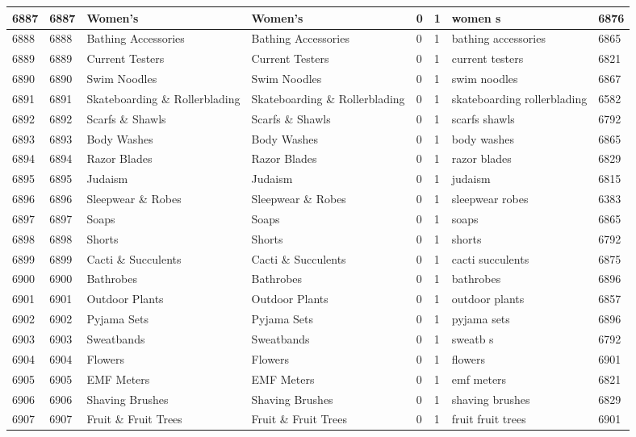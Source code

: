 \begin{longtable}{|l|l|l|l|l|l|l|l|}
6887 & 6887 & Women's & Women's & 0 & 1 & women s & 6876 \\ \hline 
6888 & 6888 & Bathing Accessories & Bathing Accessories & 0 & 1 & bathing accessories & 6865 \\ \hline 
6889 & 6889 & Current Testers & Current Testers & 0 & 1 & current testers & 6821 \\ \hline 
6890 & 6890 & Swim Noodles & Swim Noodles & 0 & 1 & swim noodles & 6867 \\ \hline 
6891 & 6891 & Skateboarding \& Rollerblading & Skateboarding \& Rollerblading & 0 & 1 & skateboarding rollerblading & 6582 \\ \hline 
6892 & 6892 & Scarfs \& Shawls & Scarfs \& Shawls & 0 & 1 & scarfs shawls & 6792 \\ \hline 
6893 & 6893 & Body Washes & Body Washes & 0 & 1 & body washes & 6865 \\ \hline 
6894 & 6894 & Razor Blades & Razor Blades & 0 & 1 & razor blades & 6829 \\ \hline 
6895 & 6895 & Judaism & Judaism & 0 & 1 & judaism & 6815 \\ \hline 
6896 & 6896 & Sleepwear \& Robes & Sleepwear \& Robes & 0 & 1 & sleepwear robes & 6383 \\ \hline 
6897 & 6897 & Soaps & Soaps & 0 & 1 & soaps & 6865 \\ \hline 
6898 & 6898 & Shorts & Shorts & 0 & 1 & shorts & 6792 \\ \hline 
6899 & 6899 & Cacti \& Succulents & Cacti \& Succulents & 0 & 1 & cacti succulents & 6875 \\ \hline 
6900 & 6900 & Bathrobes & Bathrobes & 0 & 1 & bathrobes & 6896 \\ \hline 
6901 & 6901 & Outdoor Plants & Outdoor Plants & 0 & 1 & outdoor plants & 6857 \\ \hline 
6902 & 6902 & Pyjama Sets & Pyjama Sets & 0 & 1 & pyjama sets & 6896 \\ \hline 
6903 & 6903 & Sweatbands & Sweatbands & 0 & 1 & sweatb s & 6792 \\ \hline 
6904 & 6904 & Flowers & Flowers & 0 & 1 & flowers & 6901 \\ \hline 
6905 & 6905 & EMF Meters & EMF Meters & 0 & 1 & emf meters & 6821 \\ \hline 
6906 & 6906 & Shaving Brushes & Shaving Brushes & 0 & 1 & shaving brushes & 6829 \\ \hline 
6907 & 6907 & Fruit \& Fruit Trees & Fruit \& Fruit Trees & 0 & 1 & fruit fruit trees & 6901 \\ \hline 

\end{longtable}
